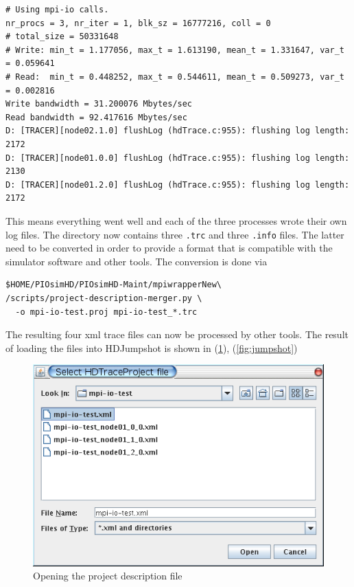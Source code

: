 \documentclass[a4paper,12pt,pdftex]{scrartcl}
\begin{document}
\begin{lstlisting}
# Using mpi-io calls.
nr_procs = 3, nr_iter = 1, blk_sz = 16777216, coll = 0
# total_size = 50331648
# Write: min_t = 1.177056, max_t = 1.613190, mean_t = 1.331647, var_t = 0.059641
# Read:  min_t = 0.448252, max_t = 0.544611, mean_t = 0.509273, var_t = 0.002816
Write bandwidth = 31.200076 Mbytes/sec
Read bandwidth = 92.417616 Mbytes/sec
D: [TRACER][node02.1.0] flushLog (hdTrace.c:955): flushing log length: 2172
D: [TRACER][node01.0.0] flushLog (hdTrace.c:955): flushing log length: 2130
D: [TRACER][node01.2.0] flushLog (hdTrace.c:955): flushing log length: 2172
\end{lstlisting}
This means everything went well and each of the three processes wrote
their own log files. The directory now contains three \verb/.trc/ and
three \verb/.info/ files. The latter need to be converted in order to
provide a format that is compatible with the simulator software and
other tools. The conversion is done via
\begin{lstlisting}
$HOME/PIOsimHD/PIOsimHD-Maint/mpiwrapperNew\
/scripts/project-description-merger.py \
  -o mpi-io-test.proj mpi-io-test_*.trc
\end{lstlisting} %
The resulting four xml trace files can now be processed by other tools. 
The result of loading the files into HDJumpshot is shown in 
(\ref{fig:jumpshot-open}), (\ref{fig:jumpshot})
\begin{figure}[h]
  \centering
  \includegraphics[scale=2]{img/jumpshot-open}
  \caption{Opening the project description file}
  \label{fig:jumpshot-open}
\end{figure}
\end{document}
